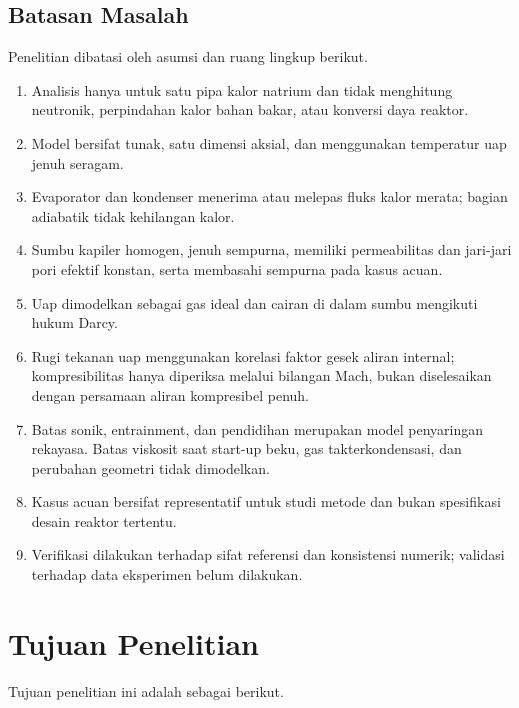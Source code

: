 \documentclass[
  12pt,
  12pt,a4paper,oneside]{report}
\providecommand{\tightlist}{%
  \setlength{\itemsep}{0pt}\setlength{\parskip}{0pt}}
\begin{document}
\hypertarget{batasan-masalah}{%
\subsection{Batasan Masalah}\label{batasan-masalah}}

Penelitian dibatasi oleh asumsi dan ruang lingkup berikut.

\begin{enumerate}
\def\labelenumi{\arabic{enumi}.}
\tightlist
\item
  Analisis hanya untuk satu pipa kalor natrium dan tidak menghitung
  neutronik, perpindahan kalor bahan bakar, atau konversi daya reaktor.
\item
  Model bersifat tunak, satu dimensi aksial, dan menggunakan temperatur
  uap jenuh seragam.
\item
  Evaporator dan kondenser menerima atau melepas fluks kalor merata;
  bagian adiabatik tidak kehilangan kalor.
\item
  Sumbu kapiler homogen, jenuh sempurna, memiliki permeabilitas dan
  jari-jari pori efektif konstan, serta membasahi sempurna pada kasus
  acuan.
\item
  Uap dimodelkan sebagai gas ideal dan cairan di dalam sumbu mengikuti
  hukum Darcy.
\item
  Rugi tekanan uap menggunakan korelasi faktor gesek aliran internal;
  kompresibilitas hanya diperiksa melalui bilangan Mach, bukan
  diselesaikan dengan persamaan aliran kompresibel penuh.
\item
  Batas sonik, entrainment, dan pendidihan merupakan model penyaringan
  rekayasa. Batas viskosit saat start-up beku, gas takterkondensasi, dan
  perubahan geometri tidak dimodelkan.
\item
  Kasus acuan bersifat representatif untuk studi metode dan bukan
  spesifikasi desain reaktor tertentu.
\item
  Verifikasi dilakukan terhadap sifat referensi dan konsistensi numerik;
  validasi terhadap data eksperimen belum dilakukan.
\end{enumerate}

\hypertarget{tujuan-penelitian}{%
\section{Tujuan Penelitian}\label{tujuan-penelitian}}

Tujuan penelitian ini adalah sebagai berikut.
\end{document}
